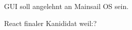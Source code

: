 \begin{flushleft}
    GUI soll angelehnt an Mainsail OS sein.
    
    React finaler Kanididat weil:?
\end{flushleft}